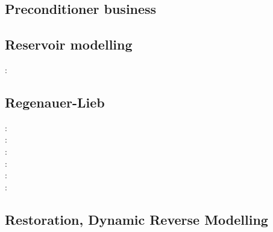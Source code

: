 \subsection{Preconditioner business}

\begin{scriptsize}
\cite{benz02}
\cite{bewa08}
\cite{urvs08}
\end{scriptsize}

\subsection{Reservoir modelling}

\begin{scriptsize}
\twothousandthirteen: \cite{orwa13}
\end{scriptsize}

\subsection{Regenauer-Lieb}

{\scriptsize
\twothousand: \cite{reyu00}\\
\twothousandthree: \cite{reyu03}\\
\twothousandfour: \cite{reyu04}\\
\twothousandsix: \cite{rehy06}\cite{rewr06}\\
\twothousandnine: \cite{reps09}\\
\twothousandthirteen: \cite{revp13}
}

\subsection{Restoration, Dynamic Reverse Modelling}

